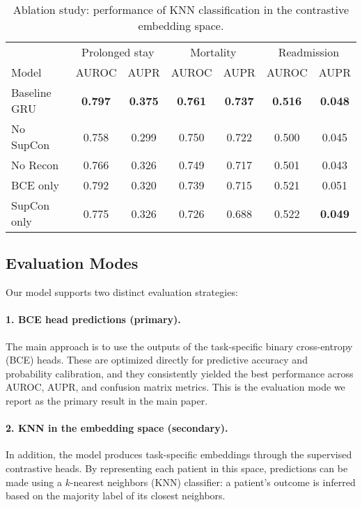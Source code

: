 \documentclass{article}
\theoremstyle{plain}
\theoremstyle{definition}
\theoremstyle{remark}
\begin{document}
\begin{table}[h]
    \centering
    \scriptsize
    \begin{tabular}{lcccccc}
        \toprule
        & \multicolumn{2}{c}{Prolonged stay} & \multicolumn{2}{c}{Mortality} & \multicolumn{2}{c}{Readmission} \\
        \cmidrule(lr){2-3}\cmidrule(lr){4-5}\cmidrule(lr){6-7}
        Model & AUROC & AUPR & AUROC & AUPR & AUROC & AUPR \\
        \midrule
        Baseline GRU & \textbf{0.797} & \textbf{0.375} & \textbf{0.761} & \textbf{0.737} & \textbf{0.516} & \textbf{0.048} \\
        No SupCon    & 0.758 & 0.299 & 0.750 & 0.722 & 0.500 & 0.045 \\
        No Recon     & 0.766 & 0.326 & 0.749 & 0.717 & 0.501 & 0.043 \\
        BCE only     & 0.792 & 0.320 & 0.739 & 0.715 & 0.521 & 0.051 \\
        SupCon only  & 0.775 & 0.326 & 0.726 & 0.688 & 0.522 & \textbf{0.049} \\
        \bottomrule
    \end{tabular}
    \caption{Ablation study: performance of KNN classification in the contrastive embedding space.}
    \label{tab:ablation_knn}
\end{table}

\subsection{Evaluation Modes}

Our model supports two distinct evaluation strategies:

\paragraph{1. BCE head predictions (primary).}  
The main approach is to use the outputs of the task-specific binary cross-entropy (BCE) heads. 
These are optimized directly for predictive accuracy and probability calibration, and they consistently 
yielded the best performance across AUROC, AUPR, and confusion matrix metrics.  
This is the evaluation mode we report as the primary result in the main paper.  

\paragraph{2. KNN in the embedding space (secondary).}  
In addition, the model produces task-specific embeddings through the supervised contrastive heads. 
By representing each patient in this space, predictions can be made using a $k$-nearest neighbors (KNN) 
classifier: a patient’s outcome is inferred based on the majority label of its closest neighbors.  
\end{document}
